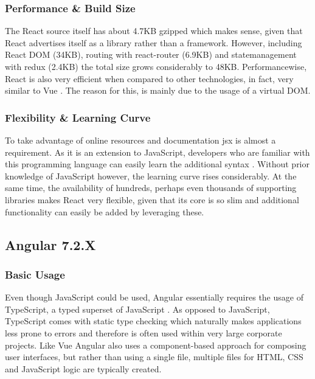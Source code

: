 \subsubsection{Performance \& Build Size}
The React source itself has about 4.7KB gzipped which makes sense, given that React advertises itself as a library rather than a framework. However, including React DOM (34KB), \gls{routing} with react-router (6.9KB) and \gls{statemanagement} with redux (2.4KB) the total size grows considerably to 48KB. Performancewise, React is also very efficient when compared to other technologies, in fact, very similar to Vue \cite{FrameworksPerformance:online}. The reason for this, is mainly due to the usage of a virtual DOM.

\subsubsection{Flexibility \& Learning Curve}
To take advantage of online resources and documentation \acrshort{jsx} is almost a requirement. As it is an extension to JavaScript, developers who are familiar with this programming language can easily learn the additional syntax \cite{ReactJSX:online}. Without prior knowledge of JavaScript however, the learning curve rises considerably. At the same time, the availability of hundreds, perhaps even thousands of supporting libraries makes React very flexible, given that its core is so slim and additional functionality can easily be added by leveraging these. 

\subsection{Angular 7.2.X}

\subsubsection{Basic Usage}
Even though JavaScript could be used, Angular essentially requires the usage of TypeScript, a typed superset of JavaScript \cite{TypeScript:online}. As opposed to JavaScript, TypeScript comes with static type checking which naturally makes applications less prone to errors \cite{DynamicallyTypedLanguages:proceedings} and therefore is often used within very large corporate projects. Like Vue Angular also uses a component-based approach for composing user interfaces, but rather than using a single file, multiple files for HTML, CSS and JavaScript logic are typically created. \newline

